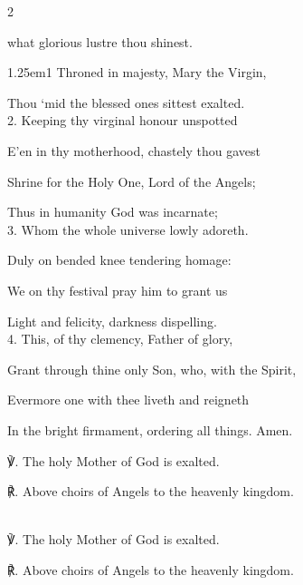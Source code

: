 \begin{multicols}{2}
\sloppy

 what glorious lustre thou shinest.


\begin{hangparas}{1.25em}{1}
Throned in majesty, Mary the Virgin,

Thou `mid the blessed ones sittest exalted.\\

2. Keeping thy virginal honour unspotted

E'en in thy motherhood, chastely thou gavest

Shrine for the Holy One, Lord of the Angels;

Thus in humanity God was incarnate;\\

3. Whom the whole universe lowly adoreth.

Duly on bended knee tendering homage:

We on thy festival pray him to grant us

Light and felicity, darkness dispelling.\\

4. This, of thy clemency, Father of glory,

Grant through thine only Son, who, with the Spirit,

Evermore one with thee liveth and reigneth

In the bright firmament, ordering all things. Amen.\\
\end{hangparas}

℣. The holy Mother of God is exalted.

℟. Above choirs of Angels to the heavenly kingdom.


\fussy	
\end{multicols}


\mattins
{}\\

℣. The holy Mother of God is exalted.

℟. Above choirs of Angels to the heavenly kingdom.

